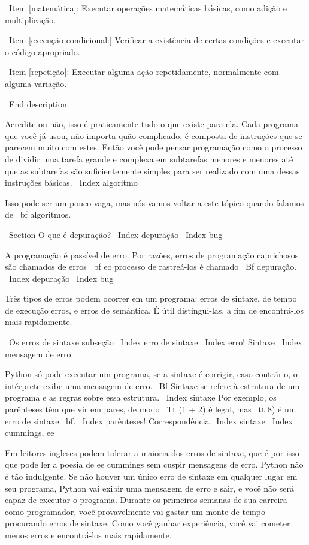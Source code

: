 \documentclass[10pt]{book}
\begin{document}
{\ Item [matemática]: Executar operações matemáticas básicas, como adição e
multiplicação.

\ Item [execução condicional:] Verificar a existência de certas condições e
executar o código apropriado.

\ Item [repetição]: Executar alguma ação repetidamente, normalmente com
alguma variação.

\ End {description}

Acredite ou não, isso é praticamente tudo o que existe para ela. Cada
programa que você já usou, não importa quão complicado, é composta de
instruções que se parecem muito com estes. Então você pode pensar
programação como o processo de dividir uma tarefa grande e complexa
em subtarefas menores e menores até que as subtarefas são
suficientemente simples para ser realizado com uma dessas instruções básicas.
\ Index {algoritmo}

Isso pode ser um pouco vaga, mas nós vamos voltar a este tópico
quando falamos de {\ bf algoritmos}.

\ Section {O que é depuração?}
\ Index {depuração}
\ Index {bug}

A programação é passível de erro. Por razões, erros de programação caprichosos
são chamados de erros {\ bf} eo processo de rastreá-los é chamado
{\ Bf depuração}.
\ Index {depuração}
\ Index {bug}

Três tipos de erros podem ocorrer em um programa: erros de sintaxe, de tempo de execução 
erros, e erros de semântica. É útil
distingui-las, a fim de encontrá-los mais rapidamente.

\ {Os erros de sintaxe} subseção
\ Index {erro de sintaxe}
\ Index {erro! Sintaxe}
\ Index {mensagem de erro}

Python só pode executar um programa, se a sintaxe é
corrigir, caso contrário, o intérprete exibe uma mensagem de erro.
{\ Bf} Sintaxe se refere à estrutura de um programa e as regras sobre
essa estrutura. \ Index {} sintaxe
Por exemplo, os parênteses têm que vir em pares, de modo
{\ Tt (1 + 2)} é legal, mas {\ tt 8)} é um erro de sintaxe {\ bf}.
\ Index {parênteses! Correspondência}
\ Index {} sintaxe
\ Index {cummings, ee}

Em leitores ingleses podem tolerar a maioria dos erros de sintaxe, que é por isso que
pode ler a poesia de ee cummings sem cuspir mensagens de erro.
Python não é tão indulgente. Se não houver um único erro de sintaxe
em qualquer lugar em seu programa, Python vai exibir uma mensagem de erro e sair,
e você não será capaz de executar o programa. Durante os primeiros
semanas de sua carreira como programador, você provavelmente vai gastar um monte de
tempo procurando erros de sintaxe. Como você ganhar experiência, você vai
cometer menos erros e encontrá-los mais rapidamente.

}
\end{document}
